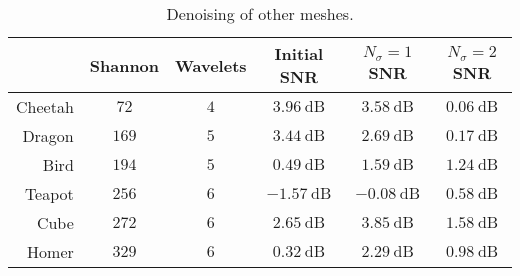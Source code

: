 \begin{table}
	\centering
	\caption{
		Denoising of other meshes.
	}\label{tab:chapter4_denoising}
	\begin{tabular}{@{}rccccc@{}}
		\toprule
		& Shannon & Wavelets & Initial SNR & \(N_{\sigma}=1\) SNR & \(N_{\sigma}=2\) SNR \\
		\midrule
		Cheetah & \(\num{72}\) & \(\num{4}\) & \(\SI{3.96}{\dB}\) & \(\SI{3.58}{\dB}\) & \(\SI{0.06}{\dB}\) \\
		Dragon & \(\num{169}\) & \(\num{5}\) & \(\SI{3.44}{\dB}\) & \(\SI{2.69}{\dB}\) & \(\SI{0.17}{\dB}\) \\
		Bird & \(\num{194}\) & \(\num{5}\) & \(\SI{0.49}{\dB}\) & \(\SI{1.59}{\dB}\) & \(\SI{1.24}{\dB}\) \\
		Teapot & \(\num{256}\) & \(\num{6}\) & \(\SI{-1.57}{\dB}\) & \(\SI{-0.08}{\dB}\) & \(\SI{0.58}{\dB}\) \\
		Cube & \(\num{272}\) & \(\num{6}\) & \(\SI{2.65}{\dB}\) & \(\SI{3.85}{\dB}\) & \(\SI{1.58}{\dB}\) \\
		Homer & \(\num{329}\) & \(\num{6}\) & \(\SI{0.32}{\dB}\) & \(\SI{2.29}{\dB}\) & \(\SI{0.98}{\dB}\) \\
		\bottomrule
	\end{tabular}
\end{table}
